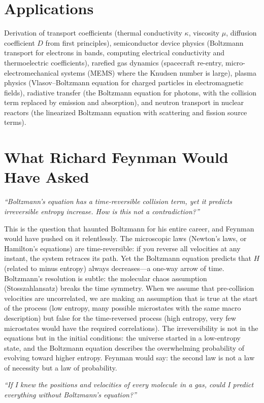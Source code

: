 \documentclass[11pt,openright]{book}
\begin{document}
\section*{Applications}

Derivation of transport coefficients (thermal conductivity $\kappa$, viscosity $\mu$, diffusion coefficient $D$ from first principles), semiconductor device physics (Boltzmann transport for electrons in bands, computing electrical conductivity and thermoelectric coefficients), rarefied gas dynamics (spacecraft re-entry, micro-electromechanical systems (MEMS) where the Knudsen number is large), plasma physics (Vlasov--Boltzmann equation for charged particles in electromagnetic fields), radiative transfer (the Boltzmann equation for photons, with the collision term replaced by emission and absorption), and neutron transport in nuclear reactors (the linearized Boltzmann equation with scattering and fission source terms).
\section*{What Richard Feynman Would Have Asked}

\textit{``Boltzmann's equation has a time-reversible collision term, yet it predicts irreversible entropy increase. How is this not a contradiction?''}

This is the question that haunted Boltzmann for his entire career, and Feynman would have pushed on it relentlessly. The microscopic laws (Newton's laws, or Hamilton's equations) are time-reversible: if you reverse all velocities at any instant, the system retraces its path. Yet the Boltzmann equation predicts that $H$ (related to minus entropy) always decreases---a one-way arrow of time. Boltzmann's resolution is subtle: the molecular chaos assumption (Stosszahlansatz) breaks the time symmetry. When we assume that pre-collision velocities are uncorrelated, we are making an assumption that is true at the start of the process (low entropy, many possible microstates with the same macro description) but false for the time-reversed process (high entropy, very few microstates would have the required correlations). The irreversibility is not in the equations but in the initial conditions: the universe started in a low-entropy state, and the Boltzmann equation describes the overwhelming probability of evolving toward higher entropy. Feynman would say: the second law is not a law of necessity but a law of probability.

\textit{``If I knew the positions and velocities of every molecule in a gas, could I predict everything without Boltzmann's equation?''}
\end{document}

